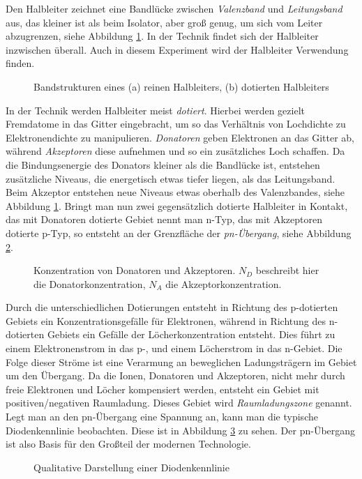 Den Halbleiter zeichnet eine Bandlücke zwischen \emph{Valenzband} und 
\emph{Leitungsband} aus, das kleiner ist als beim Isolator, aber groß genug,
um sich vom Leiter abzugrenzen, siehe Abbildung \ref{abb:band}.
In der Technik findet sich der Halbleiter inzwischen überall.
Auch in diesem Experiment wird der Halbleiter Verwendung finden. \par
\begin{figure}[h]
  \begin{subfigure}{0.3\textwidth}
    
  \end{subfigure}
  \begin{subfigure}{0.7\textwidth}
    
  \end{subfigure}
  \caption{Bandstrukturen eines (a) reinen Halbleiters, (b) dotierten Halbleiters}
  \label{abb:band}
\end{figure}
In der Technik werden Halbleiter meist \emph{dotiert}. Hierbei werden gezielt 
Fremdatome in das Gitter eingebracht, um so das Verhältnis von Lochdichte zu
Elektronendichte zu manipulieren. \emph{Donatoren} geben Elektronen an das Gitter 
ab, während \emph{Akzeptoren} diese aufnehmen und so ein zusätzliches Loch 
schaffen. Da die Bindungsenergie des Donators kleiner als die Bandlücke ist, entstehen
zusätzliche Niveaus, die energetisch etwas tiefer liegen, als das Leitungsband.
Beim Akzeptor entstehen neue Niveaus etwas oberhalb des Valenzbandes, siehe 
Abbildung \ref{abb:band}.
Bringt man nun zwei gegensätzlich dotierte Halbleiter in Kontakt, das mit Donatoren
dotierte Gebiet nennt man n-Typ, das mit Akzeptoren dotierte p-Typ, so entsteht an
der Grenzfläche der \emph{pn-Übergang}, siehe Abbildung \ref{abb:pn}.
\begin{figure}[h]
  \centering
  
  \caption{Konzentration von Donatoren und Akzeptoren. $N_D$ beschreibt hier die
           Donatorkonzentration, $N_A$ die Akzeptorkonzentration.}
  \label{abb:pn}
\end{figure}
Durch die unterschiedlichen Dotierungen entsteht in Richtung des p-dotierten Gebiets
ein Konzentrationsgefälle für Elektronen, während in Richtung des n-dotierten 
Gebiets ein Gefälle der Löcherkonzentration entsteht. Dies führt zu einem
Elektronenstrom in das p-, und einem Löcherstrom in das n-Gebiet. Die Folge dieser
Ströme ist eine Verarmung an beweglichen Ladungsträgern im Gebiet um den 
Übergang. Da die Ionen, Donatoren und Akzeptoren, nicht mehr durch freie Elektronen
und Löcher kompensiert werden, entsteht ein Gebiet mit positiven/negativen
Raumladung. Dieses Gebiet wird \emph{Raumladungszone} genannt. Legt man an den
pn-Übergang eine Spannung an, kann man die typische Diodenkennlinie beobachten.
Diese ist in Abbildung \ref{abb:diodui} zu sehen.
Der pn-Übergang ist also Basis für den Großteil der modernen Technologie.
\begin{figure}
  \centering
  \caption{Qualitative Darstellung einer Diodenkennlinie \autocite{wiki:diode}}
  \label{abb:diodui}
\end{figure}

